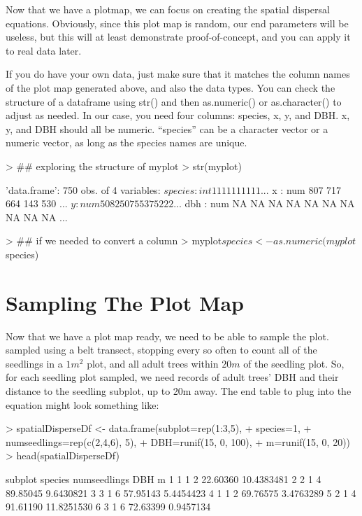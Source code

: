 \documentclass{article}
\begin{document}
Now that we have a plotmap, we can focus on creating the spatial dispersal equations. Obviously, since this plot map is random, our end parameters will be useless, but this will at least demonstrate proof-of-concept, and you can apply it to real data later.

If you do have your own data, just make sure that it matches the column names of the plot map generated above, and also the data types. You can check the structure of a dataframe using str() and then as.numeric() or as.character() to adjust as needed. In our case, you need four columns: species, x, y, and DBH. x, y, and DBH should all be numeric. ``species'' can be a character vector or a numeric vector, as long as the species names are unique.

\begin{Schunk}
\begin{Sinput}
> ## exploring the structure of myplot
> str(myplot)
\end{Sinput}
\begin{Soutput}
'data.frame':	750 obs. of  4 variables:
 $ species: int  1 1 1 1 1 1 1 1 1 1 ...
 $ x      : num  807 717 664 143 530 ...
 $ y      : num  508 250 755 375 222 ...
 $ dbh    : num  NA NA NA NA NA NA NA NA NA NA ...
\end{Soutput}
\begin{Sinput}
> ## if we needed to convert a column
> myplot$species <- as.numeric(myplot$species)
\end{Sinput}
\end{Schunk}


\section{Sampling The Plot Map}

Now that we have a plot map ready, we need to be able to sample the plot.  \citet{Ribbens1994} sampled using a belt transect, stopping every so often to count all of the seedlings in a $1 m^2$ plot, and all adult trees within $20m$ of the seedling plot. So, for each seedling plot sampled, we need records of adult trees' DBH and their distance to the seedling subplot, up to 20m away. The end table to plug into the equation might look something like:

\begin{Schunk}
\begin{Sinput}
> spatialDisperseDf <- data.frame(subplot=rep(1:3,5),
+                                 species=1,
+                                 numseedlings=rep(c(2,4,6), 5),
+                                 DBH=runif(15, 0, 100),
+                                 m=runif(15, 0, 20))
> head(spatialDisperseDf)
\end{Sinput}
\begin{Soutput}
  subplot species numseedlings      DBH          m
1       1       1            2 22.60360 10.4383481
2       2       1            4 89.85045  9.6430821
3       3       1            6 57.95143  5.4454423
4       1       1            2 69.76575  3.4763289
5       2       1            4 91.61190 11.8251530
6       3       1            6 72.63399  0.9457134
\end{Soutput}
\end{Schunk}
\end{document}
